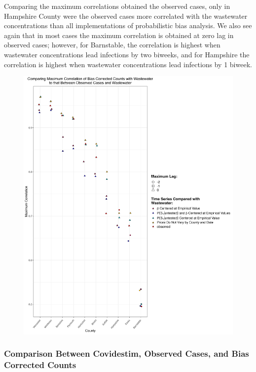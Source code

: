 \documentclass[12pt,twoside]{smiththesis}
\begin{document}
Comparing the maximum correlations obtained the observed cases, only in Hampshire County were the observed cases more correlated with the wastewater concentrations than all implementations of probabilistic bias analysis. We also see again that in most cases the maximum correlation is obtained at zero lag in observed cases; however, for Barnstable, the correlation is highest when wastewater concentrations lead infections by two biweeks, and for Hampshire the correlation is highest when wastewater concentrations lead infections by 1 biweek.
\begin{figure}
\includegraphics[width=1\linewidth]{figure/correlation_observed_pb} \caption{\label{fig:correlation_observed_pb}}\label{fig:unnamed-chunk-85}
\end{figure}
\hypertarget{comparison-between-covidestim-observed-cases-and-bias-corrected-counts}{%
\subsubsection{Comparison Between Covidestim, Observed Cases, and Bias Corrected Counts}\label{comparison-between-covidestim-observed-cases-and-bias-corrected-counts}}
\end{document}
